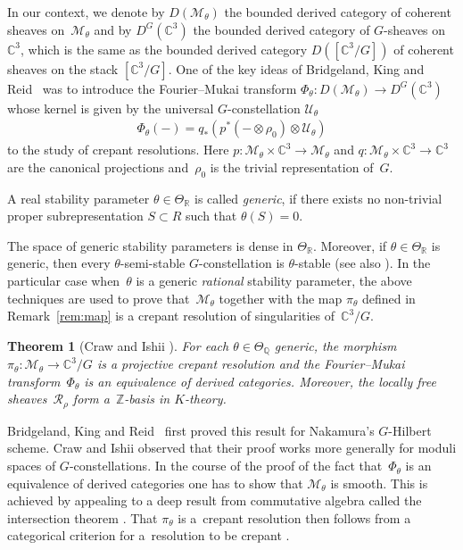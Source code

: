 \documentclass[10pt,a4paper]{amsart}
\numberwithin{equation}{section}
\newcommand{\sM}{\mathscr{M}}
\newcommand{\sR}{\mathscr{R}}
\newcommand{\sU}{\mathscr{U}}
\newcommand{\Z}{{\mathbb Z}}
\newcommand{\Q}{{\mathbb Q}}
\newcommand{\R}{{\mathbb R}}
\newcommand{\C}{{\mathbb C}}
\newtheorem{Theorem}{Theorem}[section]
\begin{document}
In our context, we denote by $D(\sM_\theta)$ the bounded derived
category of coherent sheaves on~$\sM_\theta$ and by $D^G(\C^3)$ the
bounded derived category of $G$-sheaves on $\C^3$, which is the same
as the bounded derived category $D([\C^3/G])$ of coherent sheaves on
the stack $[\C^3/G]$.  One of the key ideas of Bridgeland, King and
Reid~\cite{Bridgeland2001} was to introduce the Fourier--Mukai
transform $\Phi_\theta\colon D(\sM_\theta) \to D^G(\C^3)$ whose kernel is
given by the universal $G$-constellation $\sU_{\theta}$
\begin{gather*}%
  \Phi_\theta(-)=q_*(p^*(-\otimes\rho_0)\otimes\sU_\theta)
\end{gather*}
to the study of crepant resolutions.  Here $p\colon \sM_\theta\times
\C^3\to\sM_\theta$ and $q\colon \sM_\theta\times \C^3\to \C^3$ are the
canonical projections and~$\rho_0$ is the trivial representation of~$G$.

\begin{Definition}
  \label{Def_ThetaGeneric}
  A real stability parameter $\theta\in\Theta_\R$ is called
  \emph{generic}, if there exists no non-trivial proper
  subrepresentation $S\subset R$ such that $\theta(S)=0$.
\end{Definition}

The space of generic stability parameters is dense in
$\Theta_\R$. Moreover, if $\theta \in \Theta_{\R}$ is generic, then
every $\theta$-semi-stable $G$-constellation is $\theta$-stable
(see also \cite[Section~2.2]{Craw2004}). In the particular case when~$\theta$ is a generic {\em rational} stability parameter, the above
techniques are used to prove that~$\sM_{\theta}$ together with the map
$\pi_{\theta}$ def\/ined in Remark~\ref{rem:map} is a crepant resolution
of singularities of~$\C^3/G$.

\begin{Theorem}[Craw and Ishii ]\label{thm:bkr}
  For each $\theta \in \Theta_{\Q}$ generic, the morphism
  $\pi_{\theta}\colon \sM_\theta\to\C^3/G$ is a projective crepant
  resolution and the Fourier--Mukai transform~$\Phi_\theta$ is an
  equivalence of derived categories.  Moreover, the locally free
  sheaves~$\sR_{\rho}$ form a~$\Z$-basis in $K$-theory.
\end{Theorem}

\begin{Remark}
  Bridgeland, King and Reid~\cite{Bridgeland2001} f\/irst proved this
  result for Nakamura's $G$-Hilbert scheme.  Craw and Ishii observed
  that their proof works more generally for moduli spaces of
  $G$-constellations.  In the course of the proof of the fact that~$\Phi_\theta$ is an equivalence of derived categories one has to
  show that $\sM_\theta$ is smooth.  This is achieved by appealing to
  a deep result from commutative algebra called the intersection
  theorem \cite[Theorem~7.1]{Bridgeland2001}.  That $\pi_\theta$ is a~crepant resolution then follows from a categorical criterion for a~resolution to be crepant \cite[Lemma~3.1]{Bridgeland2001}.
\end{Remark}
\end{document}
